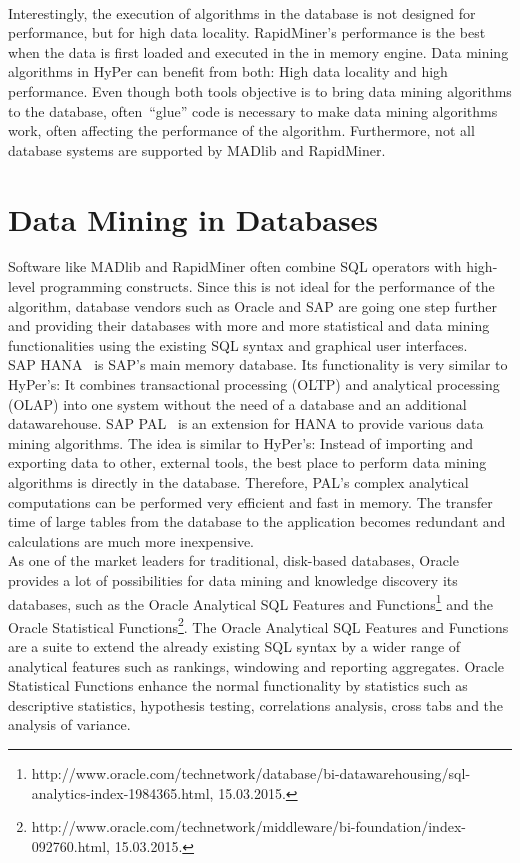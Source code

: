 \\
Interestingly, the execution of algorithms in the database is not designed for performance, but for high data locality. RapidMiner's performance is the best when the data is first loaded and executed in the in memory engine. Data mining algorithms in HyPer can benefit from both: High data locality and high performance.
Even though both tools objective is to bring data mining algorithms to the database, often~\enquote{glue} code is necessary to make data mining algorithms work, often affecting the performance of the algorithm. Furthermore, not all database systems are supported by MADlib and RapidMiner.

\section{Data Mining in Databases}
Software like MADlib and RapidMiner often combine SQL operators with high-level programming constructs. Since this is not ideal for the performance of the algorithm, database vendors such as Oracle and SAP are going one step further and providing their databases with more and more statistical and data mining functionalities using the existing SQL syntax and graphical user interfaces.
\\
SAP HANA~\parencite{SAP} is SAP's main memory database. Its functionality is very similar to HyPer's: It combines transactional processing (OLTP) and analytical processing (OLAP) into one system without the need of a database and an additional datawarehouse. 
SAP PAL~\parencite{pal} is an extension for HANA to provide various data mining algorithms. The idea is similar to HyPer's: Instead of importing and exporting data to other, external tools, the best place to perform data mining algorithms is directly in the database. Therefore, PAL's complex analytical computations can be performed very efficient and fast in memory. The transfer time of large tables from the database to the application becomes redundant and calculations are much more inexpensive.
\\
As one of the market leaders for traditional, disk-based databases, Oracle provides a lot of possibilities for data mining and knowledge discovery its databases, such as the Oracle Analytical SQL Features and Functions\footnote{http://www.oracle.com/technetwork/database/bi-datawarehousing/sql-analytics-index-1984365.html, 15.03.2015.} and the Oracle Statistical Functions\footnote{http://www.oracle.com/technetwork/middleware/bi-foundation/index-092760.html, 15.03.2015.}. The Oracle Analytical SQL Features and Functions are a suite to extend the already existing SQL syntax by a wider range of analytical features such as rankings, windowing and reporting aggregates. Oracle Statistical Functions enhance the normal functionality by statistics such as descriptive statistics, hypothesis testing, correlations analysis, cross tabs and the analysis of variance. 
